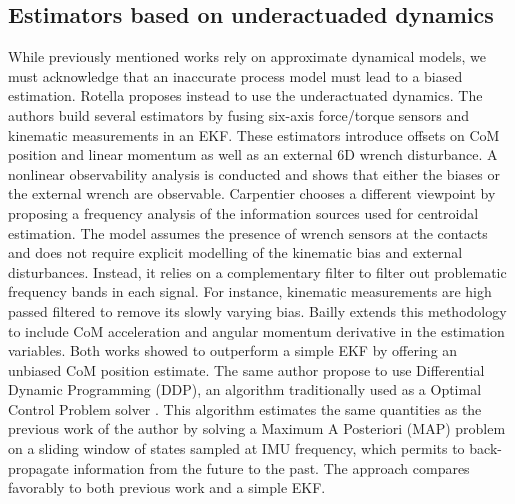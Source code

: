 \subsection{Estimators based on underactuaded dynamics}
While previously mentioned works rely on approximate dynamical models, we must acknowledge that an inaccurate process model must lead to a biased estimation. 
Rotella \cite{rotella2015humanoid} proposes instead to use the underactuated dynamics. 
The authors build several estimators by fusing six-axis force/torque sensors and kinematic measurements in an EKF. 
These estimators introduce offsets on CoM position and linear momentum as well as an external 6D wrench disturbance. A nonlinear observability analysis is conducted 
and shows that either the biases or the external wrench are observable. 
Carpentier \cite{carpentier2016center} chooses a different viewpoint by proposing a frequency analysis of the information sources used for centroidal estimation. The model
assumes the presence of wrench sensors at the contacts and does not require explicit modelling of the kinematic bias and external disturbances. Instead, it relies on a complementary filter
to filter out problematic frequency bands in each signal. For instance, kinematic measurements are high passed filtered to remove its slowly varying bias. 
Bailly \cite{bailly2019recursive} extends this methodology to include CoM acceleration and angular momentum derivative in the estimation variables. Both works showed to outperform
a simple EKF by offering an unbiased CoM position estimate.
The same author \cite{bailly2021optimal} propose to use Differential Dynamic Programming (DDP), an algorithm traditionally used as a Optimal Control Problem solver \cite{mastalli2020crocoddyl}.
This algorithm estimates the same quantities as the previous work of the author \cite{bailly2019recursive} by solving a Maximum A Posteriori (MAP) problem on a sliding window of states sampled at IMU frequency, 
which permits to back-propagate information from the future to the past. The approach compares favorably to both previous work \cite{bailly2019recursive} and a simple EKF.




